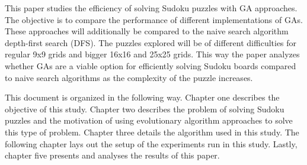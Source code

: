 This paper studies the efficiency of solving Sudoku puzzles with GA approaches. The objective is to compare the performance of different implementations of GAs. These approaches will additionally be compared to the naive search algorithm depth-first search (DFS). The puzzles explored will be of different difficulties for regular 9x9 grids and bigger 16x16 and 25x25 grids. This way the paper analyzes whether GAs are a viable option for efficiently solving Sudoku boards compared to naive search algorithms as the complexity of the puzzle increases.

This document is organized in the following way. Chapter one describes the objective of this study. Chapter two describes the problem of solving Sudoku puzzles and the motivation of using evolutionary algorithm approaches to solve this type of problem. Chapter three details the algorithm used in this study. The following chapter lays out the setup of the experiments run in this study. Lastly, chapter five presents and analyses the results of this paper.